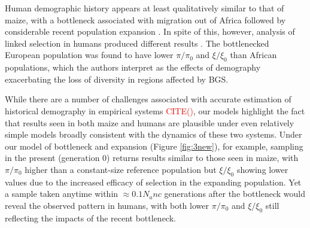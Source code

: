 \documentclass[9pt,twocolumn,twoside]{rilabRxiv}
\newcommand{\citex}[1]{{\small \textcolor{red}{CITE(#1)}}}
\begin{document}
Human demographic history appears at least qualitatively similar to that of maize, with a bottleneck associated with migration out of Africa followed by considerable recent population expansion \citep{tennessen2012evolution}.
In spite of this, however, analysis of linked selection in humans produced different results \citep{torres2018human}.
The bottlenecked European population was found to have lower $\pi/\pi_0$ and $\xi/\xi_0$ than African populations, which the authors interpret as the effects of demography exacerbating the loss of diversity in regions affected by BGS.

While there are a number of challenges associated with accurate estimation of historical demography in empirical systems \citex{}, our models highlight the fact that  results seen in both maize and humans are plausible  under even relatively simple models broadly consistent with the dynamics of these two systems.
Under our model of bottleneck and expansion (Figure \ref{fig:3new}), for example, sampling in the present (generation 0) returns results similar to those seen in maize, with $\pi/\pi_0$ higher than a constant-size reference population but $\xi/\xi_0$ showing lower values due to the increased efficacy of selection in the expanding population.
Yet a sample taken anytime within $\approx 0.1N_anc$ generations after the bottleneck would reveal the observed pattern in humans, with both lower $\pi/\pi_0$ and $\xi/\xi_0$ still reflecting the impacts of the recent bottleneck.





\end{document}
